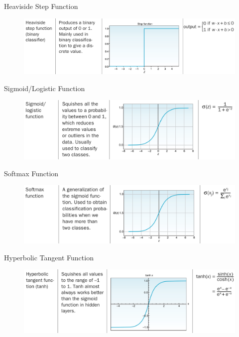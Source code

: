 \documentclass{beamer}
\begin{document}
\begin{frame}{Heaviside Step Function}
	\begin{figure}[ht]
		\centering
		\includegraphics[scale=0.2]{images/heaviside-step-function}
	\end{figure}							
\end{frame}

\begin{frame}{Sigmoid/Logistic Function}
	\begin{figure}[ht]
		\centering
		\includegraphics[scale=0.2]{images/sigmoid-function}
	\end{figure}							
\end{frame}

\begin{frame}{Softmax Function}
	\begin{figure}[ht]
		\centering
		\includegraphics[scale=0.2]{images/softmax-function}
	\end{figure}							
\end{frame}

\begin{frame}{Hyperbolic Tangent Function}
	\begin{figure}[ht]
		\centering
		\includegraphics[scale=0.2]{images/tanh-function}
	\end{figure}							
\end{frame}
\end{document}
